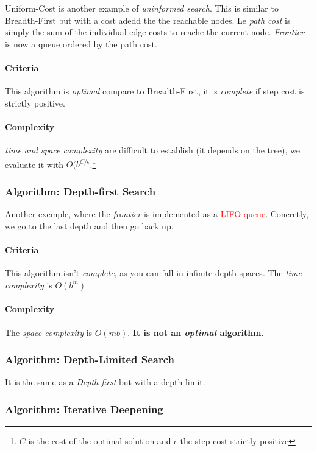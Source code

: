 Uniform-Cost is another example of \textit{uninformed search}. This is similar to Breadth-First but with a cost adedd the the reachable nodes. Le \textit{path cost} is simply the sum of the individual edge costs to reache the current node. \textit{Frontier} is now a queue ordered by the path cost.

\paragraph{Criteria}
This algorithm is \textit{optimal} compare to Breadth-First, it is \textit{complete} if step cost is strictly positive.

\paragraph{Complexity}
\textit{time and space complexity} are difficult to establish (it depends on the tree), we evaluate it with $O(b^{C/\epsilon}$.\footnote{$C$ is the cost of the optimal solution and $\epsilon$ the step cost strictly positive}

\subsubsection{Algorithm: Depth-first Search}

Another exemple, where the \textit{frontier} is implemented as a \textcolor{red}{LIFO queue}. Concretly, we go to the last depth and then go back up.

\paragraph{Criteria}
This algorithm isn't \textit{complete}, as you can fall in infinite depth spaces. The \textit{time complexity} is $O(b^m)$ 

\paragraph{Complexity}
The \textit{space complexity} is $O(mb)$. \textbf{It is not an \textit{optimal} algorithm}.

\subsubsection{Algorithm: Depth-Limited Search}

It is the same as a \textit{Depth-first} but with a depth-limit. 

\subsubsection{Algorithm: Iterative Deepening}

